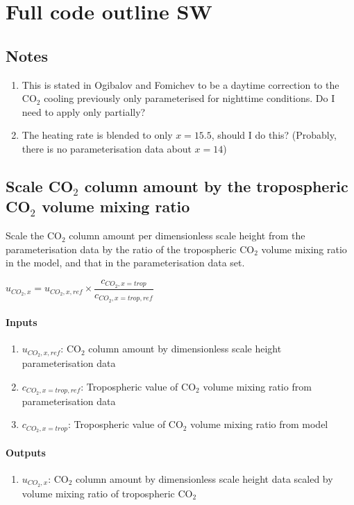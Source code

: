 \section{Full code outline SW}

\subsection{Notes}
\begin{enumerate}

\item This is stated in Ogibalov and Fomichev to be a daytime correction
  to the CO$_2$ cooling previously only parameterised for nighttime 
  conditions. Do I need to apply only partially?
\item The heating rate is blended to only $x=15.5$, should I do this? 
  (Probably, there is no parameterisation data about $x=14$)
\end{enumerate}


\subsection{Scale CO$_2$ column amount by the tropospheric CO$_2$ volume mixing ratio}

Scale the CO$_2$ column amount per dimensionless scale height from the
parameterisation data by the ratio of the tropospheric CO$_2$ volume
mixing ratio in the model, and that in the parameterisation data set.

$u_{CO_2, x} = u_{CO_2, x, ref} \times \dfrac{c_{CO_2, x=trop}}{c_{CO_2, x=trop, ref}}$

   \paragraph{Inputs}
   \begin{enumerate}
   \item $u_{CO_2, x, ref}$: CO$_2$ column amount by dimensionless scale height parameterisation data 
   \item $c_{CO_2, x=trop, ref}$: Tropospheric value of CO$_2$ volume mixing ratio from parameterisation data 
   \item $c_{CO_2, x=trop}$: Tropospheric value of CO$_2$ volume mixing ratio from model 
   \end{enumerate}

   \paragraph{Outputs}
   \begin{enumerate}
   \item $u_{CO_2, x}$: CO$_2$ column amount by dimensionless scale height data scaled by volume mixing ratio of tropospheric CO$_2$
   \end{enumerate}


